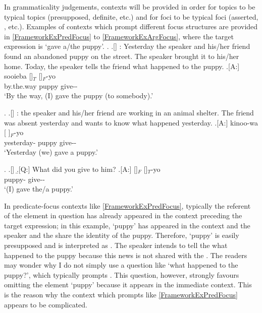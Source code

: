 In grammaticality judgements,
contexts will be provided
in order for topics to be typical topics (presupposed, definite, etc.)
and for foci to be typical foci (asserted, , etc.).
Examples of contexts which prompt different focus structures are provided in \ref{FrameworkExPredFocus} to \ref{FrameworkExArgFocus},
where the target expression is  `gave a/the puppy'.
%
	\ex. \label{FrameworkExPredFocus}
	\a.[] : Yesterday the speaker and his/her friend found an abandoned puppy on the street. The speaker brought it to his/her home. Today, the speaker tells the friend what happened to the puppy.
	\bg.[A:] sooieba []$_{T}$ []$_{F}$-yo \\
		by.the.way puppy give-- \\
		`By the way, (I) gave the puppy (to somebody).'

		\ex. \label{FrameworkExSentFocus}
		\a.[] : the speaker and his/her friend are working in an animal shelter. The friend was absent yesterday and wants to know what happened yesterday.
		\bg.[A:] kinoo-wa [ ]$_{F}$-yo \\
		yesterday- puppy give-- \\
		`Yesterday (we) gave a puppy.'

\ex. \label{FrameworkExArgFocus}\a.[] 
	\b.[Q:] What did you give to him?
	\bg.[A:] []$_{F}$ []$_{T}$-yo \\
			 puppy- give-- \\
			`(I) gave the/a puppy.'

In predicate-focus contexts like \ref{FrameworkExPredFocus},
typically the referent of the  element in question has already appeared in the context preceding the target expression;
in this example,
 `puppy' has appeared in the context and the speaker and the  share the identity of the puppy.
Therefore,
 `puppy' is easily presupposed and is interpreted as .
The speaker intends to tell the  what happened to the puppy
because this news is not shared with the .
The readers may wonder
why I do not simply use a question like `what happened to the puppy?',
which typically prompts .
This question, however,
strongly favours omitting the element  `puppy'
because it appears in the immediate context.
This is the reason why
the context which prompts  like \ref{FrameworkExPredFocus} appears to be complicated.

